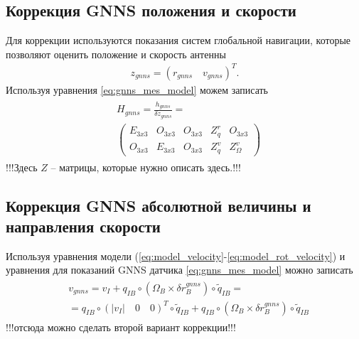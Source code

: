 \documentclass[a4paper,12pt]{article}
\begin{document}
\subsection{Коррекция GNNS положения и скорости}
Для коррекции используются показания систем глобальной навигации, которые позволяют оценить положение и скорость антенны
\begin{align}
z_{gnns} = (r_{gnns} \quad v_{gnns})^T.
\end{align}
Используя уравнения \eqref{eq:gnns_mes_model} можем записать 
\begin{align}
\begin{split}
&H_{gnns} = \frac{h_{gnns}}{\delta z_{gnns}} =  \\
&\begin{pmatrix}
E_{3x3} & O_{3x3} & O_{3x3} & Z^r_q & O_{3x3}   \\
O_{3x3} & E_{3x3} & O_{3x3} & Z^v_q & Z^v_{\Omega}
\end{pmatrix}
\end{split}
\end{align}
!!!Здесь $Z$ -- матрицы, которые нужно описать здесь.!!!

\subsection{Коррекция GNNS абсолютной величины и направления скорости}
Используя уравнения модели (\ref{eq:model_velocity}-\ref{eq:model_rot_velocity}) и уравнения для показаний GNNS датчика \eqref{eq:gnns_mes_model} можно записать
\begin{align}
\begin{split}
&v_{gnns} = v_I + q_{IB} \circ  (\Omega_B \times \delta r^{gnns}_B) \circ \tilde{q}_{IB} = \\
& = q_{IB} \circ (|v_I| \quad 0 \quad 0)^T \circ \tilde{q}_{IB} + q_{IB} \circ  (\Omega_B \times \delta r^{gnns}_B) \circ \tilde{q}_{IB}
\end{split}
\end{align}
!!!отсюда можно сделать второй вариант коррекции!!!
\end{document}
